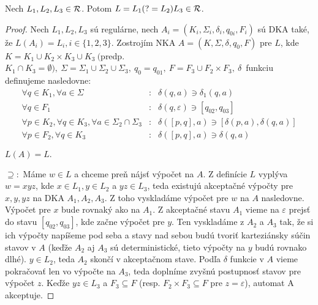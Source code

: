 \begin{veta}
Nech $ L_{1}, L_{2}, L_{3} \in {\cal R} $. Potom $ L = L_{1}(?=L_{2})L_{3} \in {\cal R} $.
\end{veta}
\begin{proof}
Nech $ L_{1},L_{2},L_{3} $ sú regulárne, nech $ A_{i} = (K_{i},\Sigma_{i},\delta_{i},q_{0i},F_{i}) $ sú DKA také, že $ L(A_{i})=L_{i}, i \in \lbrace 1,2,3\rbrace $. Zostrojím NKA $ A = (K,\Sigma,\delta,q_{0},F) $ pre $L$, kde
$ K = K_{1} \cup K_{2} \times K_{3} \cup K_{3} ~ ( $predp. $ K_{1} \cap K_{3}= \emptyset), ~
\Sigma=\Sigma_{1}\cup\Sigma_{2}\cup\Sigma_{3}, ~ q_{0}=q_{01}, ~ F = F_{3} \cup F_{2} \times F_{3}, ~ \delta $~funkciu definujeme nasledovne:
\begin{eqnarray*}
\forall q \in K_{1}, \forall a \in \Sigma &:& \delta(q,a) \ni \delta_{1}(q,a) \\
\forall q \in F_{1} &:& \delta(q,\varepsilon ) \ni \left[ q_{02},q_{03} \right] \\
\forall p \in K_{2}, \forall q \in K_{3}, \forall a \in \Sigma_{2} \cap \Sigma_{3} &:& \delta( \left[ p,q \right] ,a) \ni \left[ \delta(p,a), \delta (q,a) \right] \\
\forall p \in F_2, \forall q \in K_3 &:& \delta(\left[p,q\right],a) \ni \delta(q,a) 
\end{eqnarray*}

$ L(A) = L. $

$ \supseteq: $ Máme $ w \in L $ a chceme preň nájsť výpočet na $A$. Z definície $L$ vyplýva $w=xyz$, kde $x \in L_1, y \in L_2$ a $yz \in L_3$, teda existujú akceptačné výpočty pre $x,y,yz$ na DKA $A_1,A_2,A_3$. Z toho vyskladáme výpočet pre $w$ na $A$ nasledovne. Výpočet pre $x$ bude rovnaký ako na $A_1$. Z akceptačné stavu $A_1$ vieme na $\varepsilon$ prejsť do stavu $\left[q_{02},q_{03}\right]$, kde začne výpočet pre $y$. Ten vyskladáme z $A_2$ a $A_3$ tak, že si ich výpočty napíšeme pod seba a stavy nad sebou budú tvoriť karteziánsky súčin stavov v $A$ (keďže $A_2$ aj $A_3$ sú deterministické, tieto výpočty na $y$ budú rovnako dlhé). $y \in L_2$, teda $A_2$ skončí v akceptačnom stave. Podľa $\delta$ funkcie v $A$ vieme pokračovať len vo výpočte na $A_3$, teda doplníme zvyšnú postupnosť stavov pre výpočet $z$. Keďže $yz \in L_3$ a $F_3\subseteq F$ (resp. $F_2\times F_3\subseteq F$ pre $z=\varepsilon$), automat A akceptuje. 


\end{proof}
